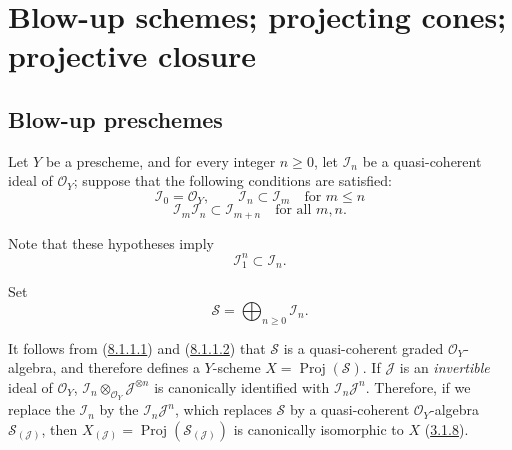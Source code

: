 \section{Blow-up schemes; projecting cones; projective closure}
\label{section:II.8}

\subsection{Blow-up preschemes}
\label{subsection:II.8.1}

\begin{env}[8.1.1]
\label{II.8.1.1}
Let $Y$ be a prescheme, and for every integer $n\geq0$, let $\mathcal{I}_n$ be a
quasi-coherent ideal of $\mathcal{O}_Y$; suppose that the following conditions
are satisfied:
\begin{equation}
\label{II.8.1.1.1}
  \mathcal{I}_0=\mathcal{O}_Y,\qquad
  \mathcal{I}_n\subset\mathcal{I}_m\quad\text{for }m\leq n
\tag{8.1.1.1}
\end{equation}
\begin{equation}
\label{II.8.1.1.2}
  \mathcal{I}_m\mathcal{I}_n\subset\mathcal{I}_{m+n}
  \quad\text{for all }m,n.
\tag{8.1.1.2}
\end{equation}

Note that these hypotheses imply
\begin{equation}
\label{II.8.1.1.3}
  \mathcal{I}_1^n\subset\mathcal{I}_n.
\tag{8.1.1.3}
\end{equation}

Set
\begin{equation}
\label{II.8.1.1.4}
  \mathcal{S}=\bigoplus_{n\geq0}\mathcal{I}_n.
\tag{8.1.1.4}
\end{equation}

It follows from (\hyperref[II.8.1.1.1]{8.1.1.1}) and
(\hyperref[II.8.1.1.2]{8.1.1.2}) that $\mathcal{S}$ is a quasi-coherent
graded $\mathcal{O}_Y$-algebra, and therefore defines a $Y$-scheme
$X=\operatorname{Proj}(\mathcal{S})$. If $\mathcal{J}$ is an \emph{invertible}
ideal of $\mathcal{O}_Y$,
$\mathcal{I}_n\otimes_{\mathcal{O}_Y}\mathcal{J}^{\otimes n}$ is canonically
identified with $\mathcal{I}_n\mathcal{J}^n$. Therefore, if we replace the
$\mathcal{I}_n$ by the $\mathcal{I}_n\mathcal{J}^n$, which replaces
$\mathcal{S}$ by a quasi-coherent $\mathcal{O}_Y$-algebra
$\mathcal{S}_{(\mathcal{J})}$, then
$X_{(\mathcal{J})}=\operatorname{Proj}(\mathcal{S}_{(\mathcal{J})})$ is
canonically isomorphic to $X$ (\hyperref[II.3.1.8]{3.1.8}).
\end{env}

